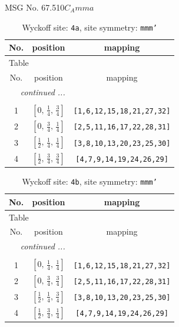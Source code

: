 \documentclass[fleqn,8pt]{jsarticle}
\begin{document}
\setcounter{MaxMatrixCols}{32}

\renewcommand{\tablename}{Table~}
\renewcommand{\figurename}{Figure~}
\begin{center}
\LARGE
MSG No. 67.510\quad$C_{A}mma$
\end{center}
\renewcommand{\arraystretch}{1.2}
\begin{longtable}{ccc}
\caption{Wyckoff site: {\tt 4a}, site symmetry: {\tt mmm'}}
 \\
 \hline \hline
No. & position & mapping \\ \hline \endfirsthead

\multicolumn{2}{l}{\tablename\ \thetable{}} \\
 \hline \hline
No. & position & mapping \\ \hline \endhead

 \hline \hline
\multicolumn{2}{r}{\footnotesize\it continued ...} \\ \endfoot

 \hline \hline
\multicolumn{2}{r}{} \\ \endlastfoot

1 & $\left[ 0,\, \frac{1}{4},\, \frac{3}{4} \right]$ & {\tt [1,6,12,15,18,21,27,32]} \\ \hline
2 & $\left[ 0,\, \frac{3}{4},\, \frac{1}{4} \right]$ & {\tt [2,5,11,16,17,22,28,31]} \\ \hline
3 & $\left[ \frac{1}{2},\, \frac{1}{4},\, \frac{1}{4} \right]$ & {\tt [3,8,10,13,20,23,25,30]} \\ \hline
4 & $\left[ \frac{1}{2},\, \frac{3}{4},\, \frac{3}{4} \right]$ & {\tt [4,7,9,14,19,24,26,29]} \\
\end{longtable}
\renewcommand{\arraystretch}{1.2}
\begin{longtable}{ccc}
\caption{Wyckoff site: {\tt 4b}, site symmetry: {\tt mmm'}}
 \\
 \hline \hline
No. & position & mapping \\ \hline \endfirsthead

\multicolumn{2}{l}{\tablename\ \thetable{}} \\
 \hline \hline
No. & position & mapping \\ \hline \endhead

 \hline \hline
\multicolumn{2}{r}{\footnotesize\it continued ...} \\ \endfoot

 \hline \hline
\multicolumn{2}{r}{} \\ \endlastfoot

1 & $\left[ 0,\, \frac{1}{4},\, \frac{1}{4} \right]$ & {\tt [1,6,12,15,18,21,27,32]} \\ \hline
2 & $\left[ 0,\, \frac{3}{4},\, \frac{3}{4} \right]$ & {\tt [2,5,11,16,17,22,28,31]} \\ \hline
3 & $\left[ \frac{1}{2},\, \frac{1}{4},\, \frac{3}{4} \right]$ & {\tt [3,8,10,13,20,23,25,30]} \\ \hline
4 & $\left[ \frac{1}{2},\, \frac{3}{4},\, \frac{1}{4} \right]$ & {\tt [4,7,9,14,19,24,26,29]} \\
\end{longtable}
\end{document}
